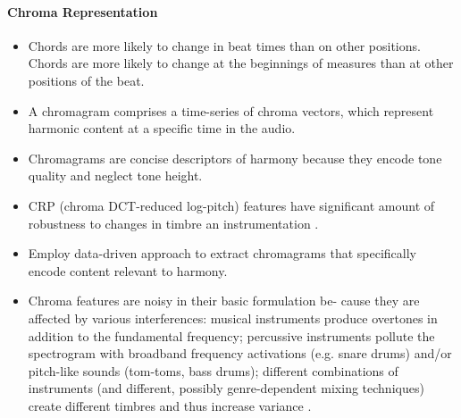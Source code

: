 \documentclass{scrartcl}
\begin{document}


\paragraph{Chroma Representation}

\begin{itemize}
\item Chords are more likely to change in beat times than on other positions. Chords are more likely to change at the beginnings of measures than at other positions of the beat.
\item A chromagram comprises a time-series of chroma vectors, which represent harmonic content at a specific time in the audio.
\item Chromagrams are concise descriptors of harmony because they encode tone quality and neglect tone height.
\item CRP (chroma DCT-reduced log-pitch) features have significant amount of robustness to changes in timbre an instrumentation \cite{Mueller2010}.
\item Employ data-driven approach to extract chromagrams that specifically encode content relevant to harmony.
\item Chroma features are noisy in their basic formulation be- cause they are affected by various interferences: musical instruments produce overtones in addition to the fundamental frequency; percussive instruments pollute the spectrogram with broadband frequency activations (e.g. snare drums) and/or pitch-like sounds (tom-toms, bass drums); different combinations of instruments (and different, possibly genre-dependent mixing techniques) create different timbres and thus increase variance \cite{Korzeniowski2016}.
\end{itemize}
\end{document}
